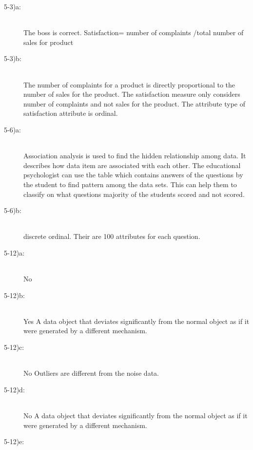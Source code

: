 \documentclass{article}
\begin{document}
\begin{enumerate}
\begin{description}
\item[5-3)a:] \hfill \\
	
The boss is correct.
Satisfaction= number of complaints /total number of sales for product

\item[5-3)b:] \hfill \\

The number of complaints for a product is directly proportional to the number of sales for the product. The satisfaction measure only considers number of complaints and not sales for the product.
The attribute type of satisfaction attribute is ordinal.

\item[5-6)a:] \hfill \\

Association analysis is used to find the hidden relationship among data.
It describes how data item are associated with each other.
The educational psychologist can use the table which contains answers of the questions by the student to find pattern among the data sets. This can help them to classify on what questions majority of the students scored and not scored.

\item[5-6)b:] \hfill \\

discrete ordinal.
Their are 100 attributes for each question.

\item[5-12)a:] \hfill \\

No

\item[5-12)b:] \hfill \\

Yes A data object that deviates significantly from the normal object as if it were generated by a different mechanism.

\item[5-12)c:] \hfill \\

No Outliers are different from the noise data.

\item[5-12)d:] \hfill \\

No A data object that deviates significantly from the normal object as if it were generated by a different mechanism.

\item[5-12)e: ] \hfill \\


\end{description}
\end{enumerate}
\end{document}
